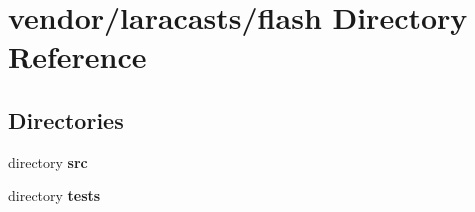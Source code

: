 \section{vendor/laracasts/flash Directory Reference}
\label{dir_26194d8efbcaf1122d678b42d39199ae}
\subsection*{Directories}
\begin{DoxyCompactItemize}
\item 
directory {\bf src}
\item 
directory {\bf tests}
\end{DoxyCompactItemize}
